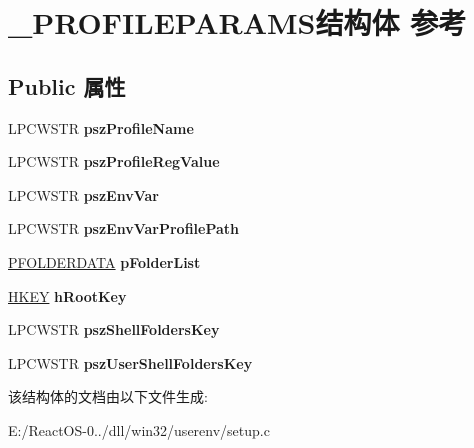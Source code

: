 \hypertarget{struct___p_r_o_f_i_l_e_p_a_r_a_m_s}{}\section{\+\_\+\+P\+R\+O\+F\+I\+L\+E\+P\+A\+R\+A\+M\+S结构体 参考}
\label{struct___p_r_o_f_i_l_e_p_a_r_a_m_s}
\subsection*{Public 属性}
\begin{DoxyCompactItemize}
\item 
\mbox{\label{struct___p_r_o_f_i_l_e_p_a_r_a_m_s_a708b9e3a2d969b0b0e9bf5804b67de2f}} 
L\+P\+C\+W\+S\+TR {\bfseries psz\+Profile\+Name}
\item 
\mbox{\label{struct___p_r_o_f_i_l_e_p_a_r_a_m_s_a4dd395ddefee637a951443af18fd2079}} 
L\+P\+C\+W\+S\+TR {\bfseries psz\+Profile\+Reg\+Value}
\item 
\mbox{\label{struct___p_r_o_f_i_l_e_p_a_r_a_m_s_aef5b3f875c8a37db940a3365b41595d2}} 
L\+P\+C\+W\+S\+TR {\bfseries psz\+Env\+Var}
\item 
\mbox{\label{struct___p_r_o_f_i_l_e_p_a_r_a_m_s_a1151d6001db51d4b435e9977dda1923c}} 
L\+P\+C\+W\+S\+TR {\bfseries psz\+Env\+Var\+Profile\+Path}
\item 
\mbox{\label{struct___p_r_o_f_i_l_e_p_a_r_a_m_s_ad346ad492471c055f615ac82e3c3b493}} 
\hyperlink{struct___f_o_l_d_e_r_d_a_t_a}{P\+F\+O\+L\+D\+E\+R\+D\+A\+TA} {\bfseries p\+Folder\+List}
\item 
\mbox{\label{struct___p_r_o_f_i_l_e_p_a_r_a_m_s_ae51d20f7f498102a3ec7591a60892d60}} 
\hyperlink{interfacevoid}{H\+K\+EY} {\bfseries h\+Root\+Key}
\item 
\mbox{\label{struct___p_r_o_f_i_l_e_p_a_r_a_m_s_aa6590f598a57d5ab89bc94acc8e1fa16}} 
L\+P\+C\+W\+S\+TR {\bfseries psz\+Shell\+Folders\+Key}
\item 
\mbox{\label{struct___p_r_o_f_i_l_e_p_a_r_a_m_s_ac8e58b27dcfcef8a3455eea86707e56e}} 
L\+P\+C\+W\+S\+TR {\bfseries psz\+User\+Shell\+Folders\+Key}
\end{DoxyCompactItemize}


该结构体的文档由以下文件生成\+:\begin{DoxyCompactItemize}
\item 
E\+:/\+React\+O\+S-\/0../dll/win32/userenv/setup.\+c\end{DoxyCompactItemize}
